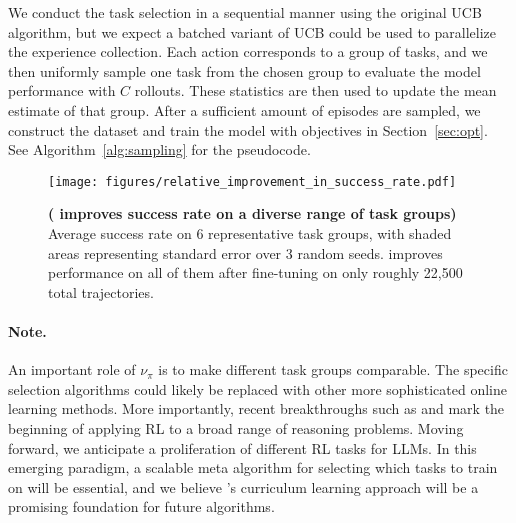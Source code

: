 We conduct the task selection in a sequential manner using the original UCB algorithm, but we expect a batched variant of UCB could be used to parallelize the experience collection.
Each action corresponds to a group of tasks, and we then uniformly sample one task from the chosen group to evaluate the model performance with $C$ rollouts. These statistics are then used to update the mean estimate of that group.
After a sufficient amount of episodes are sampled, we construct the dataset and train the model with objectives in Section~\ref{sec:opt}. See Algorithm~\ref{alg:sampling} for the pseudocode.

\begin{figure*}[t!]
    \centering
    \texttt{[image: figures/relative\_improvement\_in\_success\_rate.pdf]}
    \vspace{-0.3cm}
    \caption{\footnotesize \textbf{(\ours{} improves success rate on a diverse range of task groups)} Average success rate on 6 representative task groups, with shaded areas representing standard error over 3 random seeds. \ours{} improves performance on all of them after fine-tuning on only roughly 22,500 total trajectories.}
    \label{fig:paprika_success_rate}
    \vspace{-0.2cm}
\end{figure*}

\paragraph{Note.} An important role of $\nu_\pi$ is to make different task groups comparable. The specific selection algorithms could likely be replaced with other more sophisticated online learning methods. More importantly, recent breakthroughs such as \citet{jaech2024openai} and \citet{deepseekai2025deepseekr1incentivizingreasoningcapability} mark the beginning of applying RL to a broad range of reasoning problems. Moving forward, we anticipate a proliferation of different RL tasks for LLMs. In this emerging paradigm, a scalable meta algorithm for selecting which tasks to train on will be essential, and we believe \ours{}'s curriculum learning approach will be a promising foundation for future algorithms.



